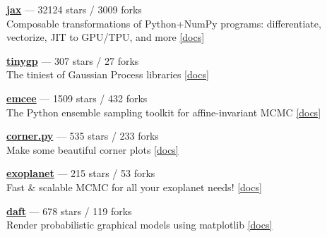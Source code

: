 \item \href{https://github.com/jax-ml/jax}{{\bf jax}} --- 32124 stars / 3009 forks \\
Composable transformations of Python+NumPy programs: differentiate, vectorize, JIT to GPU/TPU, and more \href{https://docs.jax.dev}{[docs]}

\item \href{https://github.com/dfm/tinygp}{{\bf tinygp}} --- 307 stars / 27 forks \\
The tiniest of Gaussian Process libraries \href{https://tinygp.readthedocs.io}{[docs]}

\item \href{https://github.com/dfm/emcee}{{\bf emcee}} --- 1509 stars / 432 forks \\
The Python ensemble sampling toolkit for affine-invariant MCMC \href{https://emcee.readthedocs.io}{[docs]}

\item \href{https://github.com/dfm/corner.py}{{\bf corner.py}} --- 535 stars / 233 forks \\
Make some beautiful corner plots \href{http://corner.readthedocs.io}{[docs]}

\item \href{https://github.com/exoplanet-dev/exoplanet}{{\bf exoplanet}} --- 215 stars / 53 forks \\
Fast {\&} scalable MCMC for all your exoplanet needs!  \href{https://docs.exoplanet.codes}{[docs]}

\item \href{https://github.com/daft-dev/daft}{{\bf daft}} --- 678 stars / 119 forks \\
Render probabilistic graphical models using matplotlib \href{https://docs.daft-pgm.org}{[docs]}